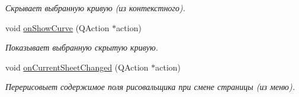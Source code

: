 \begin{DoxyCompactItemize}
\begin{DoxyCompactList}\small\item\em Скрывает выбранную кривую (из контекстного). \end{DoxyCompactList}\item 
\hypertarget{class_graph_window_a600b5476f121fb83f2d0db599becc73a}{}\label{class_graph_window_a600b5476f121fb83f2d0db599becc73a} 
void \hyperlink{class_graph_window_a600b5476f121fb83f2d0db599becc73a}{on\+Show\+Curve} (Q\+Action $\ast$action)
\begin{DoxyCompactList}\small\item\em Показывает выбранную скрытую кривую. \end{DoxyCompactList}\item 
\hypertarget{class_graph_window_ad99844f68aa659cdb599681d3cd231b1}{}\label{class_graph_window_ad99844f68aa659cdb599681d3cd231b1} 
void \hyperlink{class_graph_window_ad99844f68aa659cdb599681d3cd231b1}{on\+Current\+Sheet\+Changed} (Q\+Action $\ast$action)
\begin{DoxyCompactList}\small\item\em Перерисовыет содержимое поля рисовальщика при смене страницы (из меню). \end{DoxyCompactList}\end{DoxyCompactItemize}

